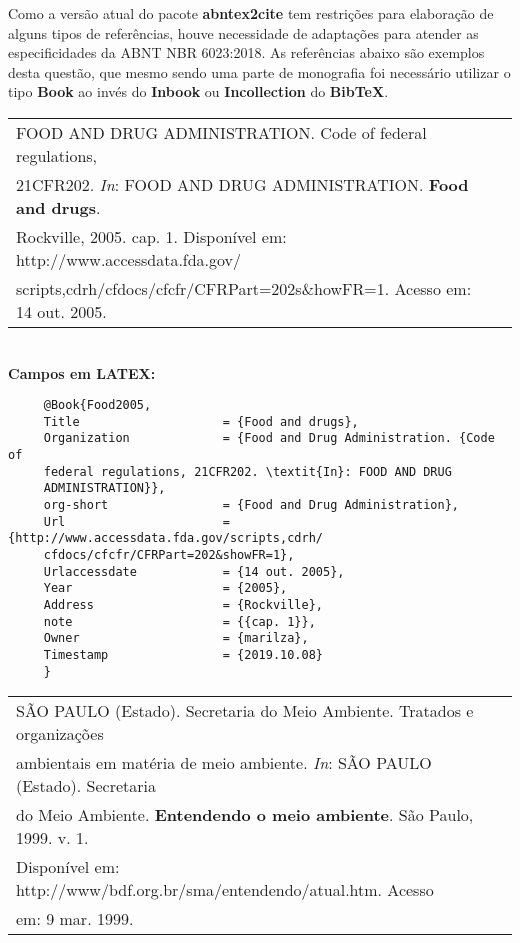 	 Como a versão atual do pacote \textbf{abntex2cite} tem restrições para elaboração de alguns tipos de referências, houve necessidade de adaptações para atender as especificidades da ABNT NBR 6023:2018. As  referências abaixo são exemplos desta questão, que mesmo sendo uma parte de monografia foi necessário utilizar o tipo  \textbf{Book} ao invés do \textbf{Inbook} ou \textbf{Incollection} do \textbf{BibTeX}. \\
	 
	 \begin{tabular}{|l|c|} \hline
	 	FOOD AND DRUG ADMINISTRATION. Code of federal regulations, \\ 21CFR202. \textit{In}: FOOD AND DRUG ADMINISTRATION. \textbf{Food and drugs}. \\Rockville, 2005. cap. 1. Disponível em: http://www.accessdata.fda.gov/\\ scripts,cdrh/cfdocs/cfcfr/CFRPart=202s\&howFR=1. Acesso em: 14 out. 2005. \\\hline
	 \end{tabular} \\ 
	 
	 \textbf{Campos em LATEX:} 
	 
	 \begin{verbatim}
	 @Book{Food2005,
	 Title                    = {Food and drugs},
	 Organization             = {Food and Drug Administration. {Code of 
	 federal regulations, 21CFR202. \textit{In}: FOOD AND DRUG 
	 ADMINISTRATION}},
	 org-short                = {Food and Drug Administration},
	 Url                      = {http://www.accessdata.fda.gov/scripts,cdrh/
	 cfdocs/cfcfr/CFRPart=202&showFR=1},
	 Urlaccessdate            = {14 out. 2005},
	 Year                     = {2005},
	 Address                  = {Rockville},
	 note                     = {{cap. 1}},
	 Owner                    = {marilza},
	 Timestamp                = {2019.10.08}
	 }
	 \end{verbatim}
	 
		 
	 \begin{tabular}{|l|c|} \hline
	 	SÃO PAULO (Estado). Secretaria do Meio Ambiente. Tratados e organizações\\ ambientais em matéria de meio ambiente. \textit{In}: SÃO PAULO (Estado). Secretaria \\ do Meio Ambiente. \textbf{Entendendo o meio ambiente}. São Paulo, 1999. v. 1. \\ Disponível em: http://www/bdf.org.br/sma/entendendo/atual.htm. Acesso \\ em: 9 mar. 1999.  \\\hline
	 \end{tabular} \\ 
	 
